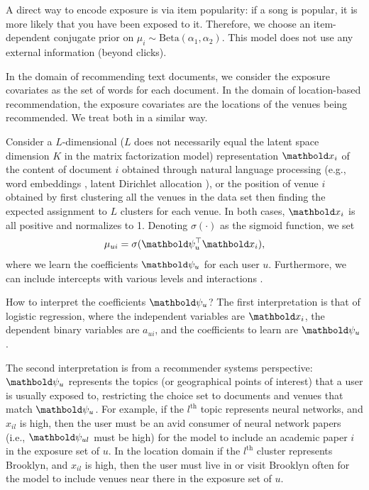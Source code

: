  A direct way to encode exposure is via item
popularity: if a song is popular, it is more likely that you have been
exposed to it. Therefore, we choose an item-dependent conjugate prior on
$\mu_i \sim \mathrm{Beta}(\alpha_1, \alpha_2)$. This model does not use
any external information (beyond clicks). 

In the domain of recommending text documents, 
we consider the exposure covariates as the set of words 
for each document. 
In the domain of location-based recommendation, 
the exposure covariates are the locations of the venues being recommended. 
We treat both in a similar way. 

Consider a $L$-dimensional ($L$ does not necessarily equal the latent space dimension $K$ in the matrix factorization model) representation $\mbx_i$ 
of the content of document $i$ 
obtained through natural language processing (e.g., word embeddings \citep{mikolov2013distributed}, latent Dirichlet allocation \citep{blei2003latent}), 
or the position of venue $i$ obtained by first clustering all the venues in the data set 
then finding the expected assignment to $L$ clusters 
for each venue. 
In both cases, $\mbx_i$ is all positive and normalizes to 1. 
Denoting $\sigma(\cdot)$ as the sigmoid function, 
we set
\begin{equation*}
	\mu_{ui} = \sigma(\mb\psi_u^\top \mbx_i), 
\end{equation*}
where we learn the coefficients $\mb\psi_u$ 
for each user $u$. Furthermore, we can include intercepts with various levels and interactions \citep{gelman2006data}. 

How to interpret the coefficients $\mb\psi_u$? 
The first interpretation is that of logistic regression, 
where the independent variables are $\mbx_i$, 
the dependent binary variables are $a_{ui}$, 
and the coefficients to learn are $\mb\psi_u$. 

The second interpretation is from a recommender systems perspective: 
$\mb\psi_u$ represents the topics (or geographical points of interest) that a user is usually exposed to, 
restricting the choice set to documents and venues that match $\mb\psi_u$. 
For example, if the $l^\mathrm{th}$ topic represents neural networks, 
and $x_{il}$ is high, 
then the user must be an avid consumer of neural network papers 
(i.e., $\mb\psi_{ul}$ must be high) 
for the model to include an academic paper $i$ in the exposure set of $u$.
In the location domain if the $l^\mathrm{th}$ cluster represents Brooklyn, 
and $x_{il}$ is high, 
then the user must live in or visit Brooklyn often 
for the model to include venues near there in the exposure set of $u$. 


